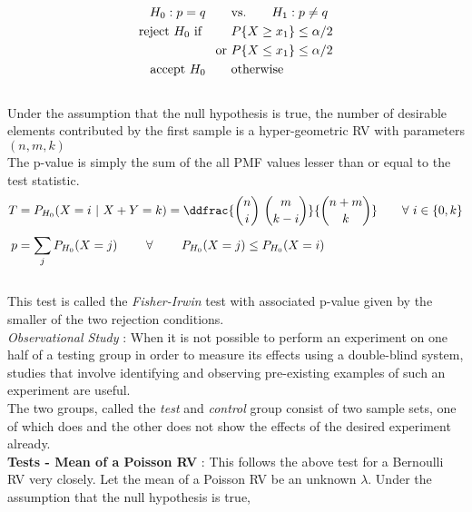 \begin{align}
	H_0 : p  = q \qquad &\text{vs.} \qquad H_1 : p  \neq q \nonumber \\
	\text{reject $ H_0 $ if } \qquad & P\{X \geq x_1\} \leq \alpha/2  \nonumber \\
	\text{or }& P\{X \leq x_1\} \leq \alpha/2 \nonumber \\
	\text{accept $ H_0 $} \qquad & \text{otherwise}
\end{align}\\

Under the assumption that the null hypothesis is true, the number of desirable elements contributed by the first sample is a hyper-geometric RV with parameters $ (n, m, k) $\\

The p-value is simply the sum of the all PMF values lesser than or equal to the test statistic.\\

\begin{align}
	T &= P_{H_0}(X = i\ |\ X+Y = k) = \ddfrac{\binom{n}{i}\ \binom{m}{k-i}}{\binom{n+m}{k}} \qquad \forall \ i \in \{0, k\} \nonumber \\[1ex]
	p &= \sum\limits_{j} P_{H_0}(X = j)\  \qquad \forall \qquad \ P_{H_0}(X = j)\leq P_{H_0}(X = i)
\end{align}\\

This test is called the \textit{Fisher-Irwin} test with associated p-value given by the smaller of the two rejection conditions.\\

\textit{Observational Study} : When it is not possible to perform an experiment on one half of a testing group in order to measure its effects using a double-blind system, studies that involve identifying and observing pre-existing examples of such an experiment are useful.\\

The two groups, called the \textit{test} and \textit{control} group consist of two sample sets, one of which does and the other does not show the effects of the desired experiment already.\\

\textbf{Tests - Mean of a Poisson RV} : This follows the above test for a Bernoulli RV very closely. Let the mean of a Poisson RV be an unknown $ \lambda $. Under the assumption that the null hypothesis is true,\\

